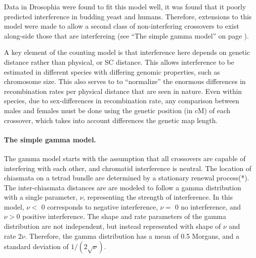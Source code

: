 Data in Drosophia were found to fit this model well, it was found that it poorly predicted interference in budding yeast and humans\cite{Foss1995}.
Therefore, extensions to this model were made to allow a second class of non-interfering crossovers to exist along-side those that are interfereing (see ``The simple gamma model'' on page \pageref{cointTPM}).

A key element of the counting model is that interference here depends on genetic distance rather than physical, or SC distance.
This allows interference to be estimated in different species with differing genomic properties, such as chromosome size.
This also serves to to ``normalize'' the enormous differences in recombination rates per physical distance that are seen in nature.
Even within species, due to sex-differences in recombination rate, any comparison between males and females must be done using the genetic position (in cM) of each crossover, which takes into account differences the genetic map length.




\paragraph{The simple gamma model.} \label{cointTPM}

The gamma model starts with the assumption that all crossovers are capable of interfering with each other, and chromatid interference is neutral.
The location of chiasmata on a tetrad bundle are determined by a stationary renewal process(*).
The inter-chiasmata distances are are modeled to follow a gamma distribution with a single parameter, $\nu$, representing the strength of interference.
In this model, $\nu <$ 0 corresponds to negative interference, $\nu=$ 0 no interference, and $\nu>$0 positive interference.
The shape and rate parameters of the gamma distribution are not independent, but instead represented with shape of $\nu$ and rate 2$\nu$.
Therefore, the gamma distribution has a mean of 0.5 Morgans, and a standard deviation of $1 / ( 2 \sqrt{\nu} )$.


